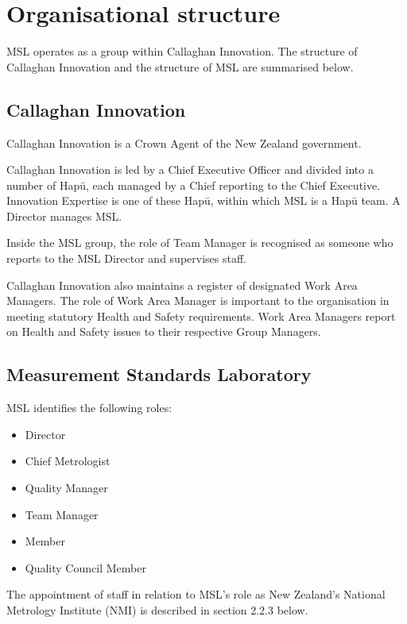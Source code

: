 \section{Organisational structure}
\label{s:organisation}
MSL operates as a group within Callaghan Innovation. The structure of Callaghan Innovation and the structure of MSL are summarised below.

\subsection{Callaghan Innovation}
Callaghan Innovation is a Crown Agent of the New Zealand government. 

Callaghan Innovation is led by a Chief Executive Officer and divided into a number of Hap\=u, each managed by a Chief reporting to the Chief Executive. Innovation Expertise is one of these Hap\=u, within which MSL is a Hap\=u team. A Director manages MSL.

Inside the MSL group, the role of Team Manager is recognised as someone who reports to the MSL Director and supervises staff.

Callaghan Innovation also maintains a register of designated Work Area Managers. The role of Work Area Manager is important to the organisation in meeting statutory Health and Safety requirements. 
Work Area Managers report on Health and Safety issues to their respective Group Managers.

\subsection{Measurement Standards Laboratory}
MSL identifies the following roles:
\begin{itemize}
\item	Director
\item	Chief Metrologist
\item	Quality Manager
\item	Team Manager
\item	Member
\item	Quality Council Member
\end{itemize}
The appointment of staff in relation to MSL's role as New Zealand's National Metrology Institute (NMI) is described in section 2.2.3 below.
